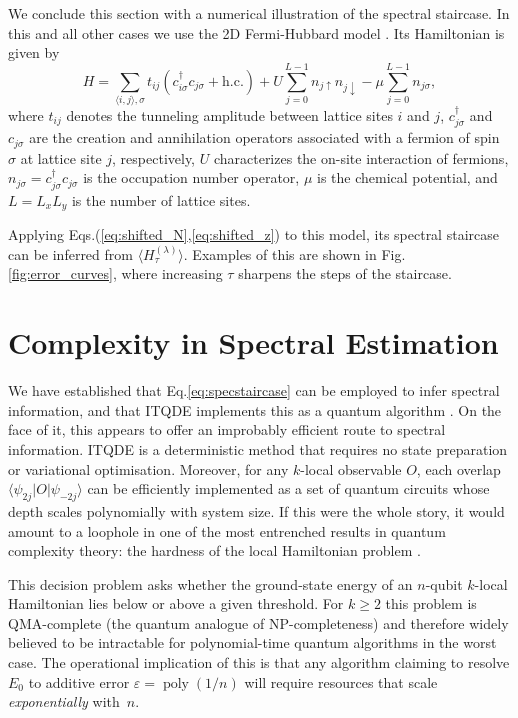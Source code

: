 \documentclass[reprint, aps,prx,showpacs,bibfootnote,preprintnumbers, mathtools, superscriptaddress, amsmath,amssymb]{revtex4-2}
\begin{document}
We conclude this section with a numerical illustration of the spectral staircase. In this and all other cases we use the 2D Fermi-Hubbard model \cite{imada_1998, anderson_1987,hofrichter_2016}. Its Hamiltonian is given by
\begin{equation}
    H = \sum_{\langle i,j\rangle,\sigma}t_{ij}(c_{i\sigma}^\dag c_{j\sigma} + \text{h.c.}) + U\sum_{j=0}^{L-1} n_{j\uparrow}n_{j\downarrow} - \mu \sum_{j=0}^{L-1} n_{j\sigma},
\end{equation}
where $t_{ij}$ denotes the tunneling amplitude between lattice sites $i$ and $j$, $c_{j\sigma}^\dag$ and  $c_{j\sigma}$ are the creation and annihilation operators associated with a fermion of spin $\sigma$ at lattice site $j$, respectively, $U$ characterizes the on-site interaction of fermions, $n_{j\sigma}=c^\dag_{j\sigma}c_{j\sigma}$ is the occupation number operator, $\mu$ is the chemical potential, and $L=L_xL_y$ is the number of lattice sites.

Applying Eqs.(\ref{eq:shifted_N},\ref{eq:shifted_z}) to this model, its spectral staircase can be inferred from $\langle H_\tau^{(\lambda)}\rangle$. Examples of this are shown in Fig.\ref{fig:error_curves}, where increasing $\tau$ sharpens the steps of the staircase.



\section{Complexity in Spectral Estimation \label{sec:complexity}}
We have established that Eq.\eqref{eq:specstaircase} can be employed to infer spectral information, and that ITQDE implements this as a quantum algorithm \cite{leamer_quantum_2024}. On the face of it, this appears to offer an improbably efficient route to spectral information. ITQDE is a deterministic method that requires no state preparation or variational optimisation. Moreover, for any $k$-local observable $O$, each overlap $\langle\psi_{2j}|O|\psi_{-2j}\rangle$  can be efficiently implemented as a set of quantum circuits whose depth scales polynomially with system size. If this were the whole story, it would amount to a loophole in one of the most entrenched results in quantum complexity theory: the hardness of the local Hamiltonian problem \cite{kitaev_classical_2002,kempe_complexity_2006, gharibian_quantum_2015, osborne_hamiltonian_2012}.

This decision problem asks whether the ground-state energy of an $n$-qubit $k$-local Hamiltonian lies below or above a given threshold. For $k\ge2$ this problem is QMA-complete (the quantum analogue of NP-completeness) and therefore widely believed to be intractable for polynomial-time quantum algorithms in the worst case.  The operational implication of this is that any algorithm claiming to resolve $E_0$ to additive error $\varepsilon = \operatorname{poly}(1/n)$  will require resources that scale \emph{exponentially} with~$n$.
\end{document}
